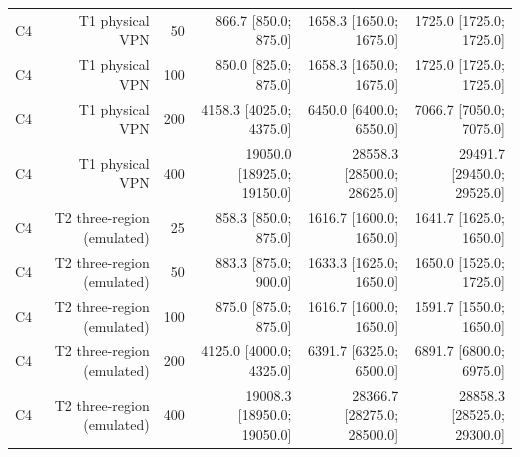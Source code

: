 \begin{table}[t]
\begin{tabular}{lrrrrr}
C4 & T1 physical VPN & 50 & 866.7 [850.0; 875.0] & 1658.3 [1650.0; 1675.0] & 1725.0 [1725.0; 1725.0] \\
C4 & T1 physical VPN & 100 & 850.0 [825.0; 875.0] & 1658.3 [1650.0; 1675.0] & 1725.0 [1725.0; 1725.0] \\
C4 & T1 physical VPN & 200 & 4158.3 [4025.0; 4375.0] & 6450.0 [6400.0; 6550.0] & 7066.7 [7050.0; 7075.0] \\
C4 & T1 physical VPN & 400 & 19050.0 [18925.0; 19150.0] & 28558.3 [28500.0; 28625.0] & 29491.7 [29450.0; 29525.0] \\
C4 & T2 three-region (emulated) & 25 & 858.3 [850.0; 875.0] & 1616.7 [1600.0; 1650.0] & 1641.7 [1625.0; 1650.0] \\
C4 & T2 three-region (emulated) & 50 & 883.3 [875.0; 900.0] & 1633.3 [1625.0; 1650.0] & 1650.0 [1525.0; 1725.0] \\
C4 & T2 three-region (emulated) & 100 & 875.0 [875.0; 875.0] & 1616.7 [1600.0; 1650.0] & 1591.7 [1550.0; 1650.0] \\
C4 & T2 three-region (emulated) & 200 & 4125.0 [4000.0; 4325.0] & 6391.7 [6325.0; 6500.0] & 6891.7 [6800.0; 6975.0] \\
C4 & T2 three-region (emulated) & 400 & 19008.3 [18950.0; 19050.0] & 28366.7 [28275.0; 28500.0] & 28858.3 [28525.0; 29300.0] \\
\hline
\end{tabular}
\end{table}
